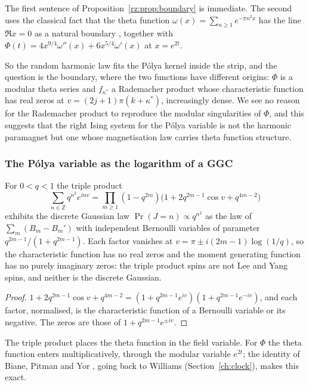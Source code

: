 The first sentence of Proposition~\ref{rz:prop:boundary} is immediate. The second uses the classical fact that the theta function $\omega(x)=\sum_{n\ge1}e^{-\pi n^2x}$ has the line $\Re x=0$ as a natural boundary \cite[Chapter~11, Section~1.4, and Chapter~5, Section~3.2]{Remmert98}, together with $\Phi(t)=4x^{9/4}\omega''(x)+6x^{5/4}\omega'(x)$ at $x=e^{2t}$.

So the random harmonic law fits the P\'olya kernel inside the strip, and the question is the boundary, where the two functions have different origins: $\Phi$ is a modular theta series and $f_{\kappa^*}$ a Rademacher product whose characteristic function has real zeros at $v=(2j+1)\pi(k+\kappa^*)$, increasingly dense. We see no reason for the Rademacher product to reproduce the modular singularities of $\Phi$, and this suggests that the right Ising system for the P\'olya variable is not the harmonic paramagnet but one whose magnetisation law carries theta function structure.

\subsubsection{The P\'olya variable as the logarithm of a GGC}

\begin{proposition}\label{rz:prop:jtp}
For $0<q<1$ the triple product
\[
\sum_{n\in\mathbb Z}q^{n^2}e^{inv}=\prod_{m\ge1}(1-q^{2m})\bigl(1+2q^{2m-1}\cos v+q^{4m-2}\bigr)
\]
exhibits the discrete Gaussian law $\Pr(J=n)\propto q^{n^2}$ as the law of $\sum_m(B_m-B_m')$ with independent Bernoulli variables of parameter $q^{2m-1}/(1+q^{2m-1})$. Each factor vanishes at $v=\pi\pm i(2m-1)\log(1/q)$, so the characteristic function has no real zeros and the moment generating function has no purely imaginary zeros: the triple product spins are not Lee and Yang spins, and neither is the discrete Gaussian.
\end{proposition}

\begin{proof}
$1+2q^{2m-1}\cos v+q^{4m-2}=(1+q^{2m-1}e^{iv})(1+q^{2m-1}e^{-iv})$, and each factor, normalised, is the characteristic function of a Bernoulli variable or its negative. The zeros are those of $1+q^{2m-1}e^{\pm iv}$.
\end{proof}

The triple product places the theta function in the field variable. For $\Phi$ the theta function enters multiplicatively, through the modular variable $e^{2t}$; the identity of Biane, Pitman and Yor \cite{BPY01}, going back to Williams \cite{Williams90} (Section~\ref{ch:clock}), makes this exact.

